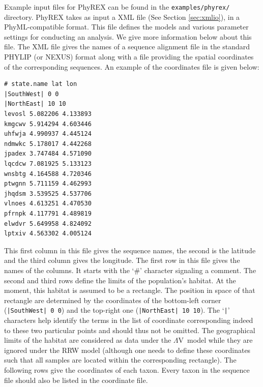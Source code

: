 \documentclass[a4paper,12pt]{article}
\newcommand{\x}[1]{\texttt{#1}}
\newcommand{\sfv}{$\Lambda$V}
\begin{document}
Example input files for PhyREX can be found in the \x{examples/phyrex/} directory.
PhyREX takes as input a XML file (See Section \ref{sec:xmlio}), in a PhyML-compatible format. This
file defines the models and various parameter settings for conducting an analysis. We give more
information below about this file. The XML file gives the names of a sequence alignment file in the
standard PHYLIP (or NEXUS) format along with a file providing the spatial coordinates of the
corresponding sequences.  An example of the coordinates file is given
below:
\begin{Verbatim}[frame=single, label=Valid PhyREX spatial location file, samepage=true, baselinestretch=0.5]
# state.name lat lon
|SouthWest| 0 0
|NorthEast| 10 10 
levosl 5.082206 4.133893 
kmgcwv 5.914294 4.603446 
uhfwja 4.990937 4.445124 
ndmwkc 5.178017 4.442268 
jpadex 3.747484 4.571090 
lqcdcw 7.081925 5.133123 
wnsbtg 4.164588 4.720346 
ptwgnn 5.711159 4.462993 
jhqdsm 3.539525 4.537706 
vlnoes 4.613251 4.470530 
pfrnpk 4.117791 4.489819 
elwdvr 5.649958 4.824092 
lptxiv 4.563302 4.005124 
\end{Verbatim}
This first column in this  file gives the sequence names, the second is  the latitude and the third
column gives the longitude. The first row in this file gives the names of the columns. It starts with
the  `\#' character  signaling  a comment.  The  second and  third  rows define  the  limits of  the
population's habitat.  At the moment,  this habitat is  assumed to be  a rectangle. The  position in
space of that rectangle are determined by  the coordinates of the bottom-left corner (\x{|SouthWest|
0 0}) and the top-right one (\x{|NorthEast| 10  10}). The `\x{|}' characters help identify the terms
in the list of coordinate corresponding indeed to these two particular points and should thus not be
omitted. The geographical limits of the habitat are considered as data under the \sfv\ model while
they are ignored under the RRW model (although one needs to define these coordinates such that all
samples are located within the corresponding rectangle). The  following rows give  the coordinates
of each taxon. Every  taxon in the  sequence file
should also be listed in the coordinate file.
\end{document}
